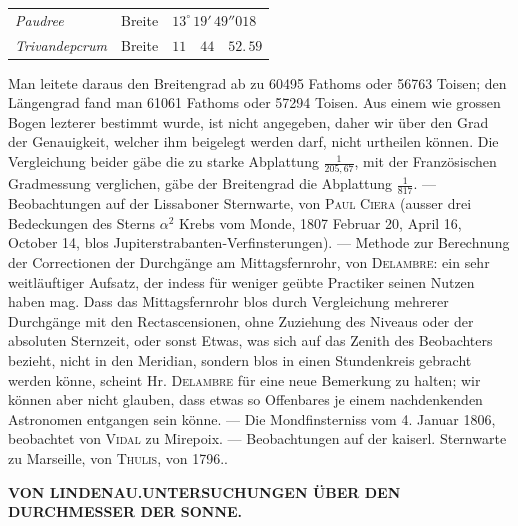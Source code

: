 \begin{center}\begin{tabular}{@{}lll@{}}\emph{Paudree} & Breite & $13^\circ\,19'\,49''018$ \\ \emph{Trivandepcrum} & Breite & $11\quad44\quad52.\,59$ \\ \end{tabular}\end{center}
\noindent Man leitete daraus den Breitengrad ab zu 60495 Fathoms oder 56763 Toisen; den Längengrad fand man 61061 Fathoms oder 57294 Toisen. Aus einem wie grossen Bogen lezterer bestimmt wurde, ist nicht angegeben, daher wir über den Grad der Genauigkeit, welcher ihm beigelegt werden darf, nicht urtheilen können. Die Vergleichung beider gäbe die zu starke Abplattung $\frac{1}{205,67}$, mit der Französischen Gradmessung verglichen, gäbe der Breitengrad die Abplattung $\frac{1}{817}$. — Beobachtungen auf der Lissaboner Sternwarte, von \textsc{Paul Ciera} (ausser drei Bedeckungen des Sterns $\alpha^2$ Krebs vom Monde, 1807 Februar 20, April 16, October 14, blos Jupiterstrabanten-Verfinsterungen). — Methode zur Berechnung der Correctionen der Durchgänge am Mittagsfernrohr, von \textsc{Delambre}: ein sehr weitläuftiger Aufsatz, der indess für weniger geübte Practiker seinen Nutzen haben mag. Dass das Mittagsfernrohr blos durch Vergleichung mehrerer Durchgänge mit den Rectascensionen, ohne Zuziehung des Niveaus oder der absoluten Sternzeit, oder sonst Etwas, was sich auf das Zenith des Beobachters bezieht, nicht in den Meridian, sondern blos in einen Stundenkreis gebracht werden könne, scheint Hr. \textsc{Delambre} für eine neue Bemerkung zu halten; wir können aber nicht glauben, dass etwas so Offenbares je einem nachdenkenden Astronomen entgangen sein könne. — Die Mondfinsterniss vom 4. Januar 1806, beobachtet von \textsc{Vidal} zu Mirepoix. — Beobachtungen auf der kaiserl. Sternwarte zu Marseille, von \textsc{Thulis}, von 1796..\par
\clearpage
\noindent{}%
\makebox[12mm][l]{}%
\parbox[t]{\dimexpr\linewidth-24mm\relax}{\centering\footnotesize\bfseries VON LINDENAU.\enspace UNTERSUCHUNGEN ÜBER DEN DURCHMESSER DER SONNE.\par}%
\par\nobreak\medskip
